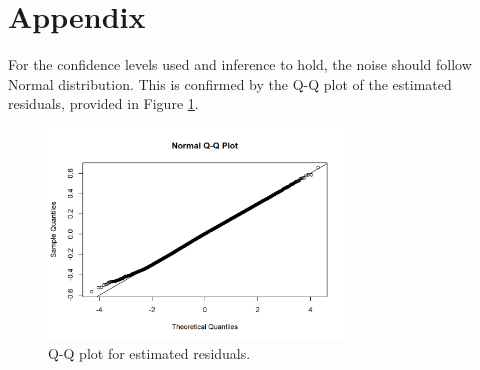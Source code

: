 \documentclass[12pt]{article}
\begin{document}
\appendix

\section{Appendix}

For the confidence levels used and inference to hold,
the noise should follow Normal distribution.
This is confirmed by the Q-Q plot of the estimated residuals,
provided in Figure \ref{qq}.

\begin{figure}[hb]
	\centering
	\includegraphics[width = 0.7\textwidth]
	{../figure/Image.png}
	\caption{
		Q-Q plot for estimated residuals.
	}
	\label{qq}
\end{figure}
\end{document}
